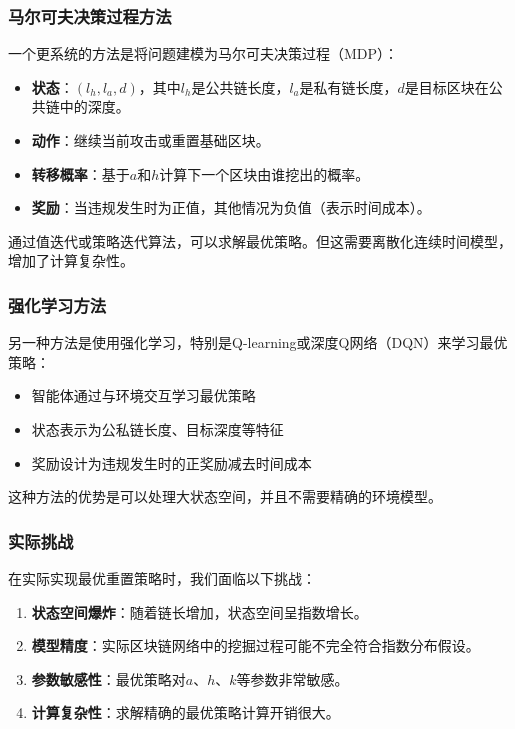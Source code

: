 \documentclass[12pt,a4paper]{article}
\begin{document}
\begin{CJK}{UTF8}{gbsn}
\subsubsection{马尔可夫决策过程方法}

一个更系统的方法是将问题建模为马尔可夫决策过程（MDP）：

\begin{itemize}
    \item \textbf{状态}：$(l_h, l_a, d)$，其中$l_h$是公共链长度，$l_a$是私有链长度，$d$是目标区块在公共链中的深度。
    \item \textbf{动作}：继续当前攻击或重置基础区块。
    \item \textbf{转移概率}：基于$a$和$h$计算下一个区块由谁挖出的概率。
    \item \textbf{奖励}：当违规发生时为正值，其他情况为负值（表示时间成本）。
\end{itemize}

通过值迭代或策略迭代算法，可以求解最优策略。但这需要离散化连续时间模型，增加了计算复杂性。

\subsubsection{强化学习方法}

另一种方法是使用强化学习，特别是Q-learning或深度Q网络（DQN）来学习最优策略：

\begin{itemize}
    \item 智能体通过与环境交互学习最优策略
    \item 状态表示为公私链长度、目标深度等特征
    \item 奖励设计为违规发生时的正奖励减去时间成本
\end{itemize}

这种方法的优势是可以处理大状态空间，并且不需要精确的环境模型。

\subsubsection{实际挑战}

在实际实现最优重置策略时，我们面临以下挑战：

\begin{enumerate}
    \item \textbf{状态空间爆炸}：随着链长增加，状态空间呈指数增长。
    \item \textbf{模型精度}：实际区块链网络中的挖掘过程可能不完全符合指数分布假设。
    \item \textbf{参数敏感性}：最优策略对$a$、$h$、$k$等参数非常敏感。
    \item \textbf{计算复杂性}：求解精确的最优策略计算开销很大。
\end{enumerate}


\end{CJK}
\end{document}
